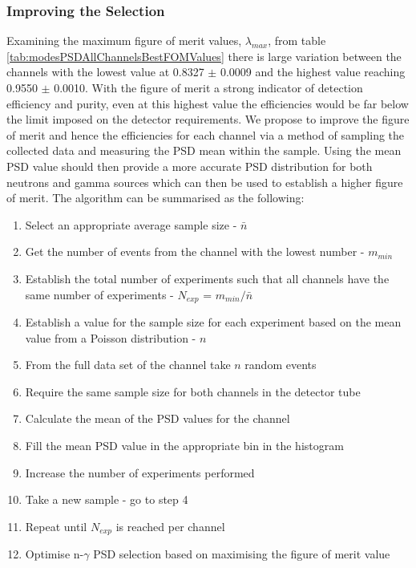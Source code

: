 \subsubsection{Improving the Selection}
Examining the maximum figure of merit values, $\lambda_{max}$, from table \ref{tab:modesPSDAllChannelsBestFOMValues} there is large variation between the channels with the lowest value at 0.8327 $\pm$ 0.0009 and the highest value reaching 0.9550 $\pm$ 0.0010. With the figure of merit a strong indicator of detection efficiency and purity, even at this highest value the efficiencies would be far below the limit imposed on the detector requirements. We propose to improve the figure of merit and hence the efficiencies for each channel via a method of sampling the collected data and measuring the PSD mean within the sample. Using the mean PSD value should then provide a more accurate PSD distribution for both neutrons and gamma sources which can then be used to establish a higher figure of merit. The algorithm can be summarised as the following:
\begin{enumerate}
	\item Select an appropriate average sample size - $\bar{n}$
	\item Get the number of events from the channel with the lowest number - $m_{min}$
	\item Establish the total number of experiments such that all channels have the same number of experiments - $N_{exp}$ = $m_{min}/\bar{n}$
	\item Establish a value for the sample size for each experiment based on the mean value from a Poisson distribution - $n$
	\item From the full data set of the channel take $n$ random events 
	\item Require the same sample size for both channels in the detector tube
	\item Calculate the mean of the PSD values for the channel
	\item Fill the mean PSD value in the appropriate bin in the histogram
	\item Increase the number of experiments performed
	\item Take a new sample - go to step 4
	\item Repeat until $N_{exp}$ is reached per channel
	\item Optimise n-$\gamma$ PSD selection based on maximising the figure of merit value	
\end{enumerate}



